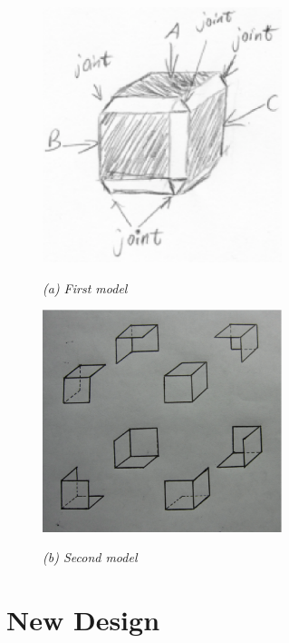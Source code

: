\begin{figure}[htb]
  \begin{minipage}[b]{2.75in}
    \centering
    \centerline{\mbox{\includegraphics[width=2.75in]{phantom/images/brain_storm/model1.eps}}}
    \centerline{\emph{(a) First model}}
  \end{minipage}\medskip
  \begin{minipage}[b]{2.75in}
    \centering
    \centerline{\mbox{\includegraphics[width=2.75in]{phantom/images/brain_storm/model2.eps}}}
    \centerline{\emph{(b) Second model}}
  \end{minipage}
\end{figure}


\section{New Design}

